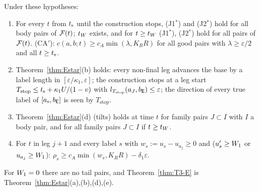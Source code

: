 \begin{theorem}\label{thm:T3-E}
Under these hypotheses:
\begin{enumerate}
\item[(a$'$)] For every $t$ from $t_{\mathrm s}$ until the construction stops, \textup{(J1$^*$)} and \textup{(J2$^*$)} hold for all body
pairs of $\mathcal F(t)$; $t_W$ exists, and for $t\ge t_W$ \textup{(J1$^*$)}, \textup{(J2$^*$)} hold for all pairs of $\mathcal F(t)$.
\textup{(CA$'$)}: $c(a,b;t)\ge c_A\min(\lambda,K_RR)$ for all good pairs with $\lambda\ge\varepsilon/2$ and all $t\ge t_{\mathrm s}$.
\item[(b$'$)] Theorem~\ref{thm:Estar}\textup{(b)} holds: every non-final leg advances the base by a label length in
$[\varepsilon/\kappa_1,\varepsilon]$; the construction stops at a leg start $T_{\mathrm{stop}}\le t_{\mathrm s}+\kappa_1U/(1-v)$ with
$l_{T_{\mathrm{stop}}}(a_J,b_{\mathsf E})\le\varepsilon$; the direction of every true label of $[a_{\mathrm s},b_{\mathsf E}]$ is seen by
$T_{\mathrm{stop}}$.
\item[(d$'$)] Theorem~\ref{thm:Estar}\textup{(d)} (tilts) holds at time $t$ for family pairs $J\subset I$ with $I$ a body pair,
and for all family pairs $J\subset I$ if $t\ge t_W$.
\item[(e$'$)] For $t$ in leg $j+1$ and every label $s$ with $w_s:=u_s-u_{a_j}\ge0$ and ($u_s'\ge W_1$ or $u_{a_j}\ge W_1$):
$\rho_s\ge c_A\min(w_s,K_RR)-\delta_1\varepsilon$.
\end{enumerate}
\end{theorem}
For $W_1=0$ there are no tail pairs, and Theorem~\ref{thm:T3-E} is Theorem~\ref{thm:Estar}(a),(b),(d),(e).

